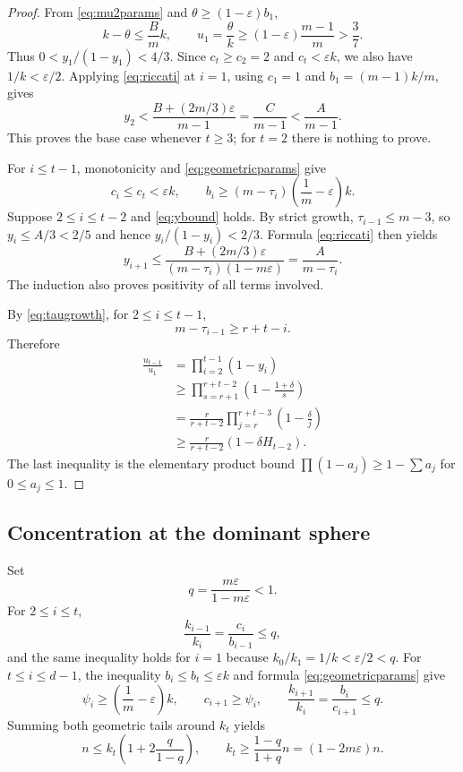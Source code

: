 \documentclass[11pt]{amsart}
\theoremstyle{definition}
\newcommand{\eps}{\varepsilon}
\begin{document}
\begin{proof}
From \eqref{eq:mu2params} and $\theta\ge(1-\eps)b_1$,
\begin{equation}\label{eq:ktheta}
 k-\theta\le\frac{B}{m}k,
 \qquad
 u_1=\frac\theta k\ge(1-\eps)\frac{m-1}{m}>\frac37.
\end{equation}
Thus $0<y_1/(1-y_1)<4/3$.  Since $c_t\ge c_2=2$ and $c_t<\eps k$, we also have $1/k<\eps/2$.  Applying \eqref{eq:riccati} at $i=1$, using $c_1=1$ and $b_1=(m-1)k/m$, gives
\[
 y_2<\frac{B+(2m/3)\eps}{m-1}
 =\frac{C}{m-1}<\frac{A}{m-1}.
\]
This proves the base case whenever $t\ge3$; for $t=2$ there is nothing to prove.

For $i\le t-1$, monotonicity and \eqref{eq:geometricparams} give
\[
 c_i\le c_t<\eps k,
 \qquad
 b_i\ge(m-\tau_i)\left(\frac1m-\eps\right)k.
\]
Suppose $2\le i\le t-2$ and \eqref{eq:ybound} holds.  By strict growth,
$\tau_{i-1}\le m-3$, so $y_i\le A/3<2/5$ and hence
$y_i/(1-y_i)<2/3$.  Formula \eqref{eq:riccati} then yields
\[
 y_{i+1}
 \le\frac{B+(2m/3)\eps}{(m-\tau_i)(1-m\eps)}
 =\frac{A}{m-\tau_i}.
\]
The induction also proves positivity of all terms involved.

By \eqref{eq:taugrowth}, for $2\le i\le t-1$,
\[
 m-\tau_{i-1}\ge r+t-i.
\]
Therefore
\begin{align*}
 \frac{u_{t-1}}{u_1}
 &=\prod_{i=2}^{t-1}(1-y_i)\\
 &\ge\prod_{s=r+1}^{r+t-2}\left(1-\frac{1+\delta}{s}\right)\\
 &=\frac{r}{r+t-2}
   \prod_{j=r}^{r+t-3}\left(1-\frac{\delta}{j}\right)\\
 &\ge\frac{r}{r+t-2}\left(1-\delta H_{t-2}\right).
\end{align*}
The last inequality is the elementary product bound
$\prod(1-a_j)\ge1-\sum a_j$ for $0\le a_j\le1$.
\end{proof}

\subsection{Concentration at the dominant sphere}
Set
\begin{equation}\label{eq:q}
 q=\frac{m\eps}{1-m\eps}<1.
\end{equation}
For $2\le i\le t$,
\[
 \frac{k_{i-1}}{k_i}=\frac{c_i}{b_{i-1}}\le q,
\]
and the same inequality holds for $i=1$ because $k_0/k_1=1/k<\eps/2<q$.  For $t\le i\le d-1$, the inequality $b_i\le b_t\le\eps k$ and formula \eqref{eq:geometricparams} give
\[
 \psi_i\ge\left(\frac1m-\eps\right)k,
 \qquad
 c_{i+1}\ge\psi_i,
 \qquad
 \frac{k_{i+1}}{k_i}=\frac{b_i}{c_{i+1}}\le q.
\]
Summing both geometric tails around $k_t$ yields
\begin{equation}\label{eq:ktmass}
 n\le k_t\left(1+2\frac{q}{1-q}\right),
 \qquad
 k_t\ge\frac{1-q}{1+q}n=(1-2m\eps)n.
\end{equation}
\end{document}
